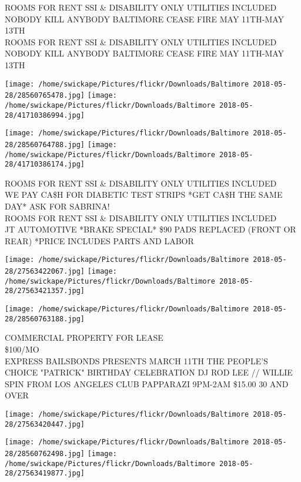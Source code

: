 \documentclass[10pt,letterpaper]{article}
\begin{document}
ROOMS FOR RENT SSI \& DISABILITY ONLY UTILITIES INCLUDED\\
NOBODY KILL ANYBODY BALTIMORE CEASE FIRE MAY 11TH{-}MAY 13TH\\
ROOMS FOR RENT SSI \& DISABILITY ONLY UTILITIES INCLUDED NOBODY KILL ANYBODY BALTIMORE CEASE FIRE MAY 11TH{-}MAY 13TH
\pagebreak

\texttt{[image: /home/swickape/Pictures/flickr/Downloads/Baltimore 2018-05-28/28560765478.jpg]}
\texttt{[image: /home/swickape/Pictures/flickr/Downloads/Baltimore 2018-05-28/41710386994.jpg]}

\texttt{[image: /home/swickape/Pictures/flickr/Downloads/Baltimore 2018-05-28/28560764788.jpg]}
\texttt{[image: /home/swickape/Pictures/flickr/Downloads/Baltimore 2018-05-28/41710386174.jpg]}

ROOMS FOR RENT SSI \& DISABILITY ONLY UTILITIES INCLUDED\\
WE PAY CA\$H FOR DIABETIC TEST STRIPS *GET CA\$H THE SAME DAY* ASK FOR SABRINA!\\
ROOMS FOR RENT SSI \& DISABILITY ONLY UTILITIES INCLUDED\\
JT AUTOMOTIVE *BRAKE SPECIAL* \$90 PADS REPLACED (FRONT OR REAR) *PRICE INCLUDES PARTS AND LABOR
\pagebreak

\texttt{[image: /home/swickape/Pictures/flickr/Downloads/Baltimore 2018-05-28/27563422067.jpg]}
\texttt{[image: /home/swickape/Pictures/flickr/Downloads/Baltimore 2018-05-28/27563421357.jpg]}

\texttt{[image: /home/swickape/Pictures/flickr/Downloads/Baltimore 2018-05-28/28560763188.jpg]}

COMMERCIAL PROPERTY FOR LEASE\\
\$100/MO\\
EXPRESS BAILSBONDS PRESENTS MARCH 11TH THE PEOPLE'S CHOICE "PATRICK" BIRTHDAY CELEBRATION DJ ROD LEE // WILLIE SPIN FROM LOS ANGELES CLUB PAPPARAZI 9PM{-}2AM \$15.00 30 AND OVER
\pagebreak

\texttt{[image: /home/swickape/Pictures/flickr/Downloads/Baltimore 2018-05-28/27563420447.jpg]}

\vspace{0.25in}
\texttt{[image: /home/swickape/Pictures/flickr/Downloads/Baltimore 2018-05-28/28560762498.jpg]}
\texttt{[image: /home/swickape/Pictures/flickr/Downloads/Baltimore 2018-05-28/27563419877.jpg]}
\end{document}
